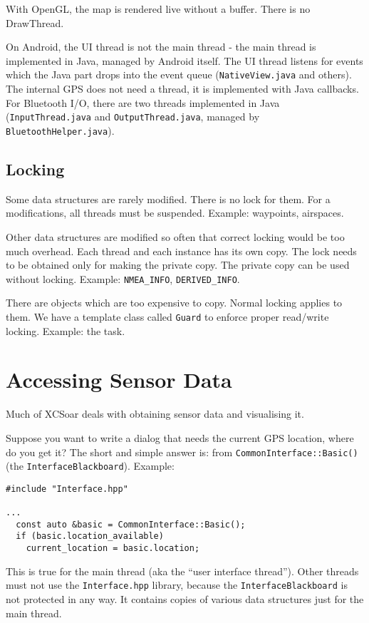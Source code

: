 \documentclass[a4paper,12pt]{refrep}
\begin{document}
With OpenGL, the map is rendered live without a buffer.  There is no
DrawThread.

On Android, the UI thread is not the main thread - the main thread is
implemented in Java, managed by Android itself.  The UI thread listens
for events which the Java part drops into the event queue
(\texttt{NativeView.java} and others).  The internal GPS does not need
a thread, it is implemented with Java callbacks.  For Bluetooth I/O,
there are two threads implemented in Java (\texttt{InputThread.java}
and \texttt{OutputThread.java}, managed by
\texttt{BluetoothHelper.java}).

\subsection{Locking}

Some data structures are rarely modified.  There is no lock for them.
For a modifications, all threads must be suspended.  Example:
waypoints, airspaces.

Other data structures are modified so often that correct locking would
be too much overhead.  Each thread and each instance has its own
copy.  The lock needs to be obtained only for making the private
copy.  The private copy can be used without locking.  Example:
\texttt{NMEA\_INFO}, \texttt{DERIVED\_INFO}.

There are objects which are too expensive to copy.  Normal locking
applies to them.  We have a template class called \texttt{Guard} to
enforce proper read/write locking.  Example: the task.


\section{Accessing Sensor Data}

Much of XCSoar deals with obtaining sensor data and visualising it.

Suppose you want to write a dialog that needs the current GPS
location, where do you get it?  The short and simple answer is: from
\verb|CommonInterface::Basic()| (the \texttt{InterfaceBlackboard}).
Example:

\begin{verbatim}
#include "Interface.hpp"

...
  const auto &basic = CommonInterface::Basic();
  if (basic.location_available)
    current_location = basic.location;
\end{verbatim}

This is true for the main thread (aka the ``user interface thread'').
Other threads must not use the \texttt{Interface.hpp} library, because
the \verb|InterfaceBlackboard| is not protected in any way.  It
contains copies of various data structures just for the main thread.
\end{document}
